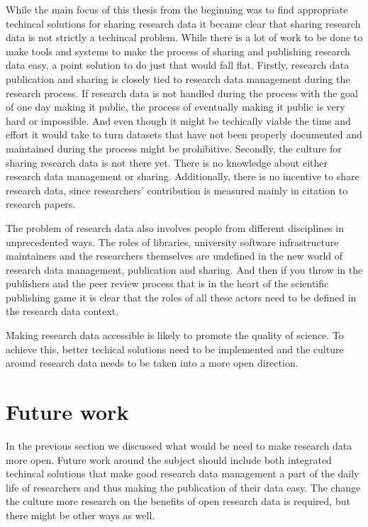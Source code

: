 While the main focus of this thesis from the beginning was to find
appropriate techincal solutions for sharing research data it became clear
that sharing research data is not strictly a techincal problem. While there is
a lot of work to be done to make tools and systems to make the process of
sharing and publishing research data easy, a point solution to do just that
would fall flat. Firstly, research data publication and sharing is closely
tied to research data management during the research process. If research data
is not handled during the process with the goal of one day making it public,
the process of eventually making it public is very hard or impossible. And even
though it might be techically viable the time and effort it would take to
turn datasets that have not been properly documented and maintained during the
process might be prohibitive. Secondly, the culture for sharing research data
is not there yet. There is no knowledge about either research data management
or sharing. Additionally, there is no incentive to share research data, since
researchers' contribution is measured mainly in citation to research papers.

The problem of research data also involves people from different disciplines
in unprecedented ways. The roles of libraries, university software
infrastructure maintainers and the researchers themselves are undefined in
the new world of research data management, publication and sharing. And then
if you throw in the publishers and the peer review process that is in the
heart of the scientific publishing game it is clear that the roles of all
these actors need to be defined in the research data context.

Making research data accessible is likely to promote the quality of science.
To achieve this, better techical solutions need to be implemented and the
culture around research data needs to be taken into a more open direction.

\section{Future work}

In the previous section we discussed what would be need to make research data
more open. Future work around the subject should include both integrated
techincal solutions that make good research data management a part of the
daily life of researchers and thus making the publication of their data easy.
The change the culture more research on the benefits of open research data
is required, but there might be other ways as well.

